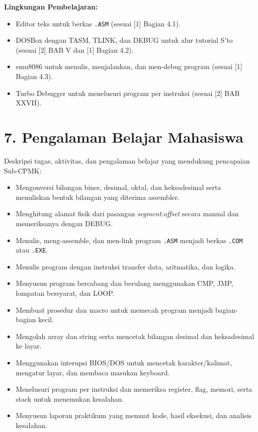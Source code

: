 \documentclass[12pt,a4paper]{article}
\begin{document}
\textbf{Lingkungan Pembelajaran:}
\begin{itemize}[leftmargin=*]
  \item Editor teks untuk berkas \texttt{.ASM} (sesuai [1] Bagian 4.1).
  \item DOSBox dengan TASM, TLINK, dan DEBUG untuk alur tutorial S'to (sesuai [2] BAB V dan [1] Bagian 4.2).
  \item emu8086 untuk menulis, menjalankan, dan men-debug program (sesuai [1] Bagian 4.3).
  \item Turbo Debugger untuk menelusuri program per instruksi (sesuai [2] BAB XXVII).
\end{itemize}

\vspace{0.5cm}

\section*{7. Pengalaman Belajar Mahasiswa}

Deskripsi tugas, aktivitas, dan pengalaman belajar yang mendukung pencapaian Sub-CPMK:

\begin{itemize}[leftmargin=*]
  \item Mengonversi bilangan biner, desimal, oktal, dan heksadesimal serta menuliskan bentuk bilangan yang diterima assembler.
  \item Menghitung alamat fisik dari pasangan \textit{segment:offset} secara manual dan memeriksanya dengan DEBUG.
  \item Menulis, meng-assemble, dan men-link program \texttt{.ASM} menjadi berkas \texttt{.COM} atau \texttt{.EXE}.
  \item Menulis program dengan instruksi transfer data, aritmatika, dan logika.
  \item Menyusun program bercabang dan berulang menggunakan CMP, JMP, lompatan bersyarat, dan LOOP.
  \item Membuat prosedur dan macro untuk memecah program menjadi bagian-bagian kecil.
  \item Mengolah array dan string serta mencetak bilangan desimal dan heksadesimal ke layar.
  \item Menggunakan interupsi BIOS/DOS untuk mencetak karakter/kalimat, mengatur layar, dan membaca masukan keyboard.
  \item Menelusuri program per instruksi dan memeriksa register, flag, memori, serta stack untuk menemukan kesalahan.
  \item Menyusun laporan praktikum yang memuat kode, hasil eksekusi, dan analisis kesalahan.
\end{itemize}
\end{document}
